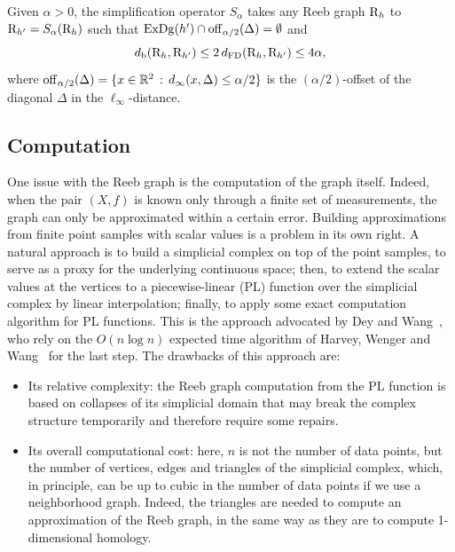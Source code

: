 \begin{lem} \label{lem:stabsmooth}
Given $\alpha>0$, the simplification operator $S_\alpha$ takes any Reeb graph 
$\mathrm{R}_h$ to $\mathrm{R}_{h'}=S_\alpha(\mathrm{R}_h)$ such that $\mathrm{ExDg}(h')\cap {\rm off}_{\alpha/2}(\Delta)=\emptyset$  
and $$d_{\rm b}(\mathrm{R}_h,\mathrm{R}_{h'})\leq 2\,d_{\rm FD}(\mathrm{R}_h,\mathrm{R}_{h'}) \leq 4\alpha,$$
where ${\rm off}_{\alpha/2}(\Delta)=\{x\in\mathbb{R}^2\,:\,d_\infty(x,\Delta)\leq \alpha/2\}$ is the $(\alpha/2)$-offset
of the diagonal $\Delta$ in the $\ell_\infty$-distance.
\end{lem} 


\subsection{Computation}

One issue with the Reeb graph is the computation of the graph itself. 
Indeed, when the pair $(X,f)$ is known only through a finite set of measurements, the
graph can only be approximated within a certain error.
Building approximations from finite point samples with scalar values
is a problem in its own right. A natural approach is to build a
simplicial complex %
on top of the point samples, to serve as a proxy for the underlying continuous
space; then, to extend the scalar values at the vertices to a
piecewise-linear (PL) function over the simplicial complex by linear
interpolation; finally, to apply some exact computation algorithm for
PL functions. This is the approach advocated by Dey and
Wang~\cite{Dey13a}, who rely on the $O(n\log n)$ expected time
algorithm of Harvey, Wenger and Wang~\cite{Harvey10} for
the last step. The drawbacks of this approach are:

\begin{itemize}
\item Its relative complexity: the Reeb graph computation from the PL
  function is based on collapses of its simplicial domain that may
  break the complex structure temporarily and therefore require some repairs.
\item Its overall computational cost: here, $n$ is not the number of
  data points, but the number of vertices, edges and triangles of the
  simplicial complex, which, in principle, can be up to cubic in the number
  of data points 
  if we use a neighborhood graph. %
  Indeed, the triangles are needed to compute an
  approximation of the Reeb graph, in the same way as they are to
  compute 1-dimensional homology.
\end{itemize}
















